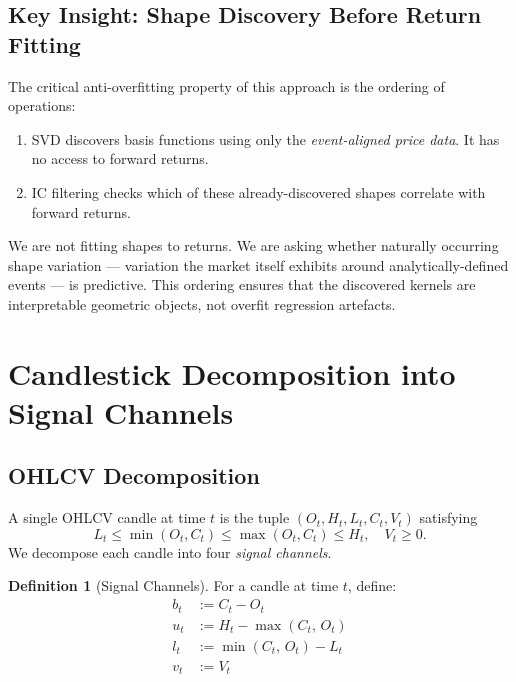 \documentclass[11pt,a4paper]{article}
\theoremstyle{definition}
\newtheorem{definition}{Definition}[section]
\theoremstyle{plain}
\begin{document}
\subsection{Key Insight: Shape Discovery Before Return Fitting}

The critical anti-overfitting property of this approach is the ordering of operations:
\begin{enumerate}
    \item SVD discovers basis functions using only the \emph{event-aligned price data}.
          It has no access to forward returns.
    \item IC filtering checks which of these already-discovered shapes correlate with
          forward returns.
\end{enumerate}
We are not fitting shapes to returns. We are asking whether naturally occurring shape
variation --- variation the market itself exhibits around analytically-defined events ---
is predictive. This ordering ensures that the discovered kernels are interpretable
geometric objects, not overfit regression artefacts.

\section{Candlestick Decomposition into Signal Channels}
\label{sec:channels}

\subsection{OHLCV Decomposition}

A single OHLCV candle at time $t$ is the tuple $(O_t, H_t, L_t, C_t, V_t)$ satisfying
\begin{equation}
    L_t \leq \min(O_t, C_t) \leq \max(O_t, C_t) \leq H_t, \quad V_t \geq 0.
    \label{eq:ohlcv_constraint}
\end{equation}
We decompose each candle into four \emph{signal channels}.

\begin{definition}[Signal Channels]
\label{def:channels}
For a candle at time $t$, define:
\begin{align}
    b_t &:= C_t - O_t
          \label{eq:body} \\
    u_t &:= H_t - \max(C_t,\, O_t)
          \label{eq:upper_wick} \\
    l_t &:= \min(C_t,\, O_t) - L_t
          \label{eq:lower_wick} \\
    v_t &:= V_t
          \label{eq:volume_channel}
\end{align}
\end{definition}
\end{document}
